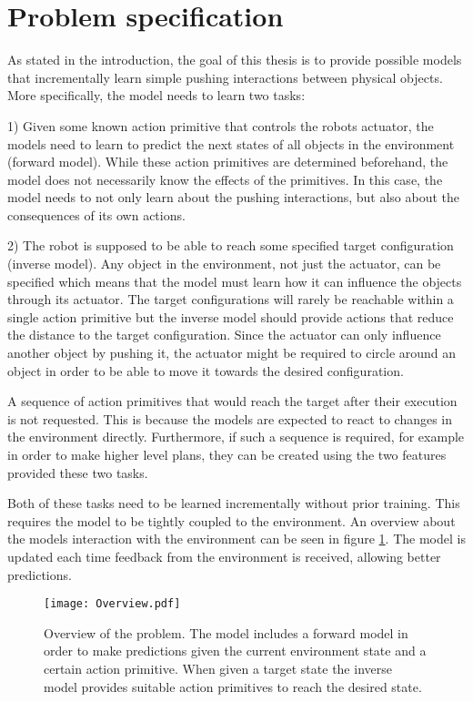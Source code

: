 \section{Problem specification \label{sec:problem}}

As stated in the introduction, the goal of this thesis is to provide possible models that incrementally learn simple pushing interactions between physical objects. 
More specifically, the model needs to learn two tasks:

1) Given some known action primitive that controls the robots actuator, the models need to learn to predict the next states of all objects in the environment (forward model). 
While these action primitives are determined beforehand, the model does not necessarily know the effects of the primitives. In this case, the model needs to not only learn about the pushing interactions, but also about the consequences of its own actions.

2) The robot is supposed to be able to reach some specified target configuration (inverse model). Any object in the environment, not just the actuator, can be specified which means that the model must learn how it can influence the objects through its actuator. The target configurations will rarely be reachable within a single action primitive but the inverse model should provide actions that reduce the distance to the target configuration. 
Since the actuator can only influence another object by pushing it, the actuator might be required to circle around an object in order to be able to move it towards the desired configuration.

A sequence of action primitives that would reach the target after their execution is not requested. This is because the models are expected to react to changes in the environment directly. Furthermore, if such a sequence is required, for example in order to make higher level plans, they can be created using the two features provided these two tasks.

Both of these tasks need to be learned incrementally without prior training. This requires the model to be tightly coupled to the environment. An overview about the models interaction with the environment can be seen in figure \ref{fig:overview}. The model is updated each time feedback from the environment is received, allowing better predictions.

\begin{figure}
	\centering
	\texttt{[image: Overview.pdf]}
	\caption{Overview of the problem. The model includes a forward model in order to make predictions given the current environment state and a certain action primitive. When given a target state the inverse model provides suitable action primitives to reach the desired state.}
	\label{fig:overview}
\end{figure}

